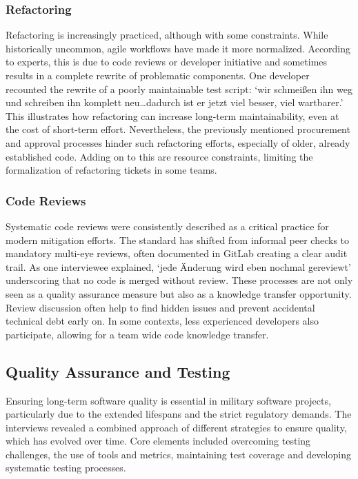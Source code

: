 \subsubsection{Refactoring}
Refactoring is increasingly practiced, although with some constraints. While historically uncommon, agile workflows have made it more normalized. According to experts, this is due to code reviews or developer initiative and sometimes results in a complete rewrite of problematic components.
One developer recounted the rewrite of a poorly maintainable test script: `wir schmeißen ihn weg und schreiben ihn komplett neu\ldots dadurch ist er jetzt viel besser, viel wartbarer.' This illustrates how refactoring can increase long-term maintainability, even at the cost of short-term effort.
Nevertheless, the previously mentioned procurement and approval processes hinder such refactoring efforts, especially of older, already established code. Adding on to this are resource constraints, limiting the formalization of refactoring tickets in some teams.\\

\subsubsection{Code Reviews}
Systematic code reviews were consistently described as a critical practice for modern mitigation efforts. The standard has shifted from informal peer checks to mandatory multi-eye reviews, often documented in GitLab creating a clear audit trail. As one interviewee explained, `jede Änderung wird eben nochmal gereviewt'
underscoring that no code is merged without review. These processes are not only seen as a quality assurance measure but also as a knowledge transfer opportunity. Review discussion often help to find hidden issues and prevent accidental technical debt early on. In some contexts,
less experienced developers also participate, allowing for a team wide code knowledge transfer.\\

\subsection{Quality Assurance and Testing}
Ensuring long-term software quality is essential in military software projects, particularly due to the extended lifespans and the strict regulatory demands. The interviews revealed a combined approach of different strategies to ensure quality, which has evolved over time.
Core elements included overcoming testing challenges, the use of tools and metrics, maintaining test coverage and developing systematic testing processes.

